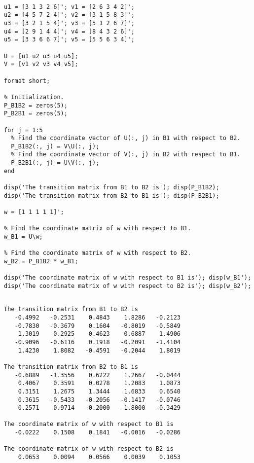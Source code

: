 \begin{sol}
\begin{verbatim}

u1 = [3 1 3 2 6]'; v1 = [2 6 3 4 2]';
u2 = [4 5 7 2 4]'; v2 = [3 1 5 8 3]';
u3 = [3 2 1 5 4]'; v3 = [5 1 2 6 7]';
u4 = [2 9 1 4 4]'; v4 = [8 4 3 2 6]';
u5 = [3 3 6 6 7]'; v5 = [5 5 6 3 4]';

U = [u1 u2 u3 u4 u5]; 
V = [v1 v2 v3 v4 v5]; 

format short;

% Initialization.
P_B1B2 = zeros(5); 
P_B2B1 = zeros(5); 

for j = 1:5
  % Find the coordinate vector of U(:, j) in B1 with respect to B2.
  P_B1B2(:, j) = V\U(:, j);
  % Find the coordinate vector of V(:, j) in B2 with respect to B1.
  P_B2B1(:, j) = U\V(:, j);
end

disp('The transition matrix from B1 to B2 is'); disp(P_B1B2);
disp('The transition matrix from B2 to B1 is'); disp(P_B2B1);

w = [1 1 1 1 1]';

% Find the coordinate matrix of w with respect to B1.
w_B1 = U\w; 

% Find the coordinate matrix of w with respect to B2.
w_B2 = P_B1B2 * w_B1; 

disp('The coordinate matrix of w with respect to B1 is'); disp(w_B1');
disp('The coordinate matrix of w with respect to B2 is'); disp(w_B2');
\end{verbatim}


\begin{outputs}
\begin{verbatim}

The transition matrix from B1 to B2 is
   -0.4992   -0.2531    0.4843    1.8286   -0.2123
   -0.7830   -0.3679    0.1604   -0.8019   -0.5849
    1.3019    0.2925    0.4623    0.6887    1.4906
   -0.9096   -0.6116    0.1918   -0.2091   -1.4104
    1.4230    1.8082   -0.4591   -0.2044    1.8019

The transition matrix from B2 to B1 is
   -0.6889   -1.3556    0.6222    1.2667   -0.0444
    0.4067    0.3591    0.0278    1.2083    1.0873
    0.3151    1.2675    1.3444    1.6833    0.6540
    0.3615   -0.5433   -0.2056   -0.1417   -0.0746
    0.2571    0.9714   -0.2000   -1.8000   -0.3429

The coordinate matrix of w with respect to B1 is
   -0.0222    0.1508    0.1841   -0.0016   -0.0286

The coordinate matrix of w with respect to B2 is
    0.0653    0.0094    0.0566    0.0039    0.1053
\end{verbatim}
\end{outputs}

\end{sol}
